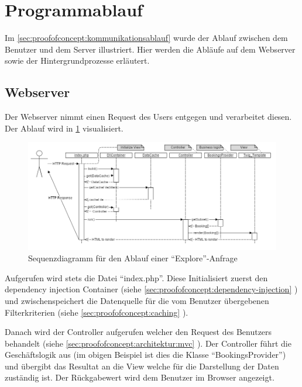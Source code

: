 \section{Programmablauf}
Im \cref{sec:proofofconcept:kommunikationsablauf} wurde der Ablauf zwischen dem Benutzer und dem Server illustriert. Hier werden die Abläufe auf dem Webserver sowie der Hintergrundprozesse erläutert.

\subsection{Webserver}
\label{sec:proofofconcept:architektur:webserver}
Der Webserver nimmt einen Request des Users entgegen und verarbeitet diesen. Der Ablauf wird in \cref{fig:proofofconcept:architektur:webserver:1} visualisiert.

\begin{figure}[H]
	\centering
	\includegraphics[width=1\textwidth]{images/diagram-sequence-controllers}
	\caption{Sequenzdiagramm für den Ablauf einer "`Explore"'-Anfrage}
	\label{fig:proofofconcept:architektur:webserver:1}
\end{figure}

Aufgerufen wird stets die Datei "`index.php"'. Diese Initialisiert zuerst den dependency injection Container (siehe \cref{sec:proofofconcept:dependency-injection} ) und zwischenspeichert die Datenquelle für die vom Benutzer übergebenen Filterkriterien (siehe \cref{sec:proofofconcept:caching} ).

Danach wird der Controller aufgerufen welcher den Request des Benutzers behandelt (siehe \cref{sec:proofofconcept:architektur:mvc} ). Der Controller führt die Geschäftslogik aus (im obigen Beispiel ist dies die Klasse "`BookingsProvider"') und übergibt das Resultat an die View welche für die Darstellung der Daten zuständig ist. Der Rückgabewert wird dem Benutzer im Browser angezeigt.

